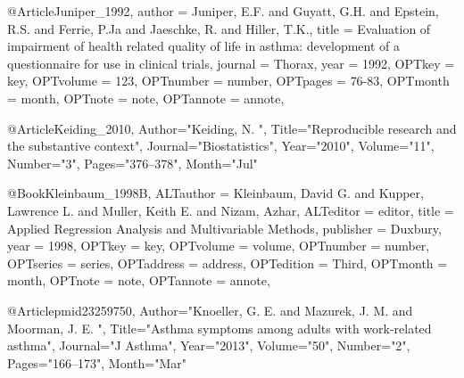 {{{@Article{Juniper_1992,
author = {Juniper, E.F. and Guyatt, G.H. and Epstein, R.S. and Ferrie, P.Ja and Jaeschke, R. and Hiller, T.K.},
title = {Evaluation of impairment of health related quality of life in asthma: development of a questionnaire for use in clinical trials},
journal = {Thorax},
year = {1992},
OPTkey = {key},
OPTvolume = {123},
OPTnumber = {number},
OPTpages = {76-83},
OPTmonth = {month},
OPTnote = {note},
OPTannote = {annote},
}


@Article{Keiding_2010,
   Author="Keiding, N. ",
   Title="{{R}eproducible research and the substantive context}",
   Journal="Biostatistics",
   Year="2010",
   Volume="11",
   Number="3",
   Pages="376--378",
   Month="Jul"
}

@Book{Kleinbaum_1998B,
ALTauthor = {Kleinbaum, David G. and Kupper, Lawrence L. and
Muller, Keith E. and Nizam, Azhar},
ALTeditor = {editor},
title = {Applied Regression Analysis and Multivariable 
Methods},
publisher = {Duxbury},
year = {1998},
OPTkey = {key},
OPTvolume = {volume},
OPTnumber = {number},
OPTseries = {series},
OPTaddress = {address},
OPTedition = {Third},
OPTmonth = {month},
OPTnote = {note},
OPTannote = {annote},
}

@Article{pmid23259750,
   Author="Knoeller, G. E.  and Mazurek, J. M.  and Moorman, J. E. ",
   Title="{{A}sthma symptoms among adults with work-related asthma}",
   Journal="J Asthma",
   Year="2013",
   Volume="50",
   Number="2",
   Pages="166--173",
   Month="Mar"
}

}}}
